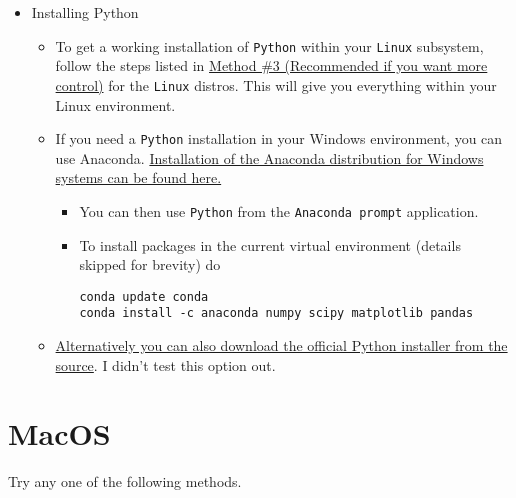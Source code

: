 \documentclass[11pt]{article}
\begin{document}
\begin{itemize}
\item Installing Python
\label{sec:orgb3b2780}

\begin{itemize}
\item To get a working installation of \texttt{Python} within your \texttt{Linux} subsystem, follow
the steps listed in \hyperref[sec:org42d5371]{Method \#3 (Recommended if you want more control)} for the
\texttt{Linux} distros. This will give you everything within your Linux environment.
\item If you need a \texttt{Python} installation in your Windows environment, you can use
Anaconda. \href{https://www.anaconda.com/download/\#windows}{Installation of the Anaconda distribution for Windows systems can be found here.}
\begin{itemize}
\item You can then use \texttt{Python} from the \texttt{Anaconda prompt} application.
\item To install packages in the current virtual environment (details skipped for
brevity) do
\begin{verbatim}
conda update conda
conda install -c anaconda numpy scipy matplotlib pandas
\end{verbatim}
\end{itemize}
\item \href{https://www.python.org/downloads/windows/}{Alternatively you can also download the official Python installer from the source}. I
didn't test this option out.
\end{itemize}
\end{itemize}

\section*{MacOS}
\label{sec:org00af4d8}
Try any one of the following methods.
\end{document}

